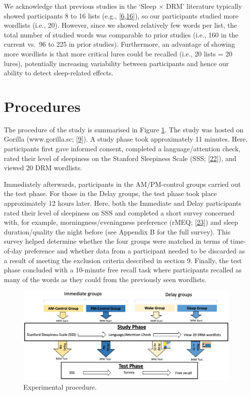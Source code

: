 \documentclass[
]{article}
\begin{document}
We acknowledge that previous studies in the `Sleep \(\times\) DRM' literature typically showed participants 8 to 16 lists (e.g., {[}\protect\hyperlink{ref-payne2009a}{6},\protect\hyperlink{ref-mckeon2012a}{16}{]}), so our participants studied more wordlists (i.e., 20). However, since we showed relatively few words per list, the total number of studied words was comparable to prior studies (i.e., 160 in the current vs.~96 to 225 in prior studies). Furthermore, an advantage of showing more wordlists is that more critical lures could be recalled (i.e., 20 lists = 20 lures), potentially increasing variability between participants and hence our ability to detect sleep-related effects.

\hypertarget{procedures}{%
\section{Procedures}\label{procedures}}

The procedure of the study is summarised in Figure \ref{fig:expprocedure}. The study was hosted on Gorilla (www.gorilla.sc; {[}\protect\hyperlink{ref-anwyl-irvine2020a}{9}{]}). A study phase took approximately 11 minutes. Here, participants first gave informed consent, completed a language/attention check, rated their level of sleepiness on the Stanford Sleepiness Scale (SSS; {[}\protect\hyperlink{ref-hoddes1973a}{22}{]}), and viewed 20 DRM wordlists.

Immediately afterwards, participants in the AM/PM-control groups carried out the test phase. For those in the Delay groups, the test phase took place approximately 12 hours later. Here, both the Immediate and Delay participants rated their level of sleepiness on SSS and completed a short survey concerned with, for example, morningness/eveningness preference (rMEQ; {[}\protect\hyperlink{ref-adan1991a}{23}{]}) and sleep duration/quality the night before (see Appendix B for the full survey). This survey helped determine whether the four groups were matched in terms of time-of-day preference and whether data from a participant needed to be discarded as a result of meeting the exclusion criteria described in section 9. Finally, the test phase concluded with a 10-minute free recall task where participants recalled as many of the words as they could from the previously seen wordlists.

\begin{figure}

{\centering \includegraphics{Figures/expprocedure} 

}

\caption{Experimental procedure.}\label{fig:expprocedure}
\end{figure}
\end{document}
